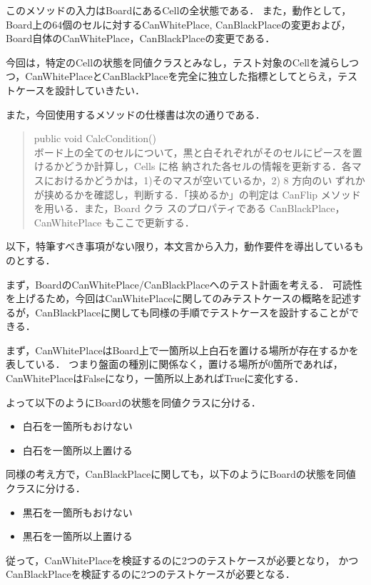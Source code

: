 \documentclass[platex,dvipdfmx,12pt]{jsarticle}
\begin{document}
このメソッドの入力はBoardにあるCellの全状態である．
また，動作として，Board上の64個のセルに対するCanWhitePlace, CanBlackPlaceの変更および，Board自体のCanWhitePlace，CanBlackPlaceの変更である．

今回は，特定のCellの状態を同値クラスとみなし，テスト対象のCellを減らしつつ，CanWhitePlaceとCanBlackPlaceを完全に独立した指標としてとらえ，テストケースを設計していきたい．

また，今回使用するメソッドの仕様書は次の通りである．

\begin{quote}
public void CalcCondition() \\

ボード上の全てのセルについて，黒と白それぞれがそのセルにピースを置けるかどうか計算し，Cells に格
納された各セルの情報を更新する．各マスにおけるかどうかは，1)そのマスが空いているか，2) 8 方向のい
ずれかが挟めるかを確認し，判断する．「挟めるか」の判定は CanFlip メソッドを用いる．また，Board クラ
スのプロパティである CanBlackPlace，CanWhitePlace もここで更新する．
\end{quote}

以下，特筆すべき事項がない限り，本文言から入力，動作要件を導出しているものとする．

まず，BoardのCanWhitePlace/CanBlackPlaceへのテスト計画を考える．
可読性を上げるため，今回はCanWhitePlaceに関してのみテストケースの概略を記述するが，CanBlackPlaceに関しても同様の手順でテストケースを設計することができる．

まず，CanWhitePlaceはBoard上で一箇所以上白石を置ける場所が存在するかを表している．
つまり盤面の種別に関係なく，置ける場所が0箇所であれば，CanWhitePlaceはFalseになり，一箇所以上あればTrueに変化する．

よって以下のようにBoardの状態を同値クラスに分ける．

\begin{itemize}
  \item 白石を一箇所もおけない
  \item 白石を一箇所以上置ける
\end{itemize}

同様の考え方で，CanBlackPlaceに関しても，以下のようにBoardの状態を同値クラスに分ける．

\begin{itemize}
  \item 黒石を一箇所もおけない
  \item 黒石を一箇所以上置ける
\end{itemize}

従って，CanWhitePlaceを検証するのに2つのテストケースが必要となり，
かつCanBlackPlaceを検証するのに2つのテストケースが必要となる．
\end{document}
